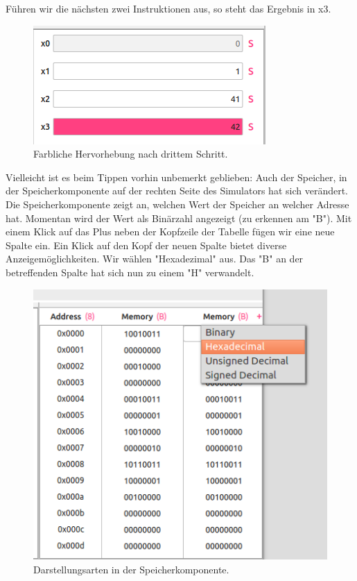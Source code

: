 Führen wir die nächsten zwei Instruktionen aus, so steht das Ergebnis in x3.
\begin{figure}[H]
	\centering
	\includegraphics[scale=1.0]{Images/first-steps-5.png}
	\caption{Farbliche Hervorhebung nach drittem Schritt.}
\end{figure}

Vielleicht ist es beim Tippen vorhin unbemerkt geblieben: Auch der Speicher, in
der Speicherkomponente auf der rechten Seite des Simulators hat sich verändert.
Die Speicherkomponente zeigt an, welchen Wert der Speicher an welcher Adresse
hat. Momentan wird der Wert als Binärzahl angezeigt (zu erkennen am "B"). Mit
einem Klick auf das Plus neben der Kopfzeile der Tabelle fügen wir eine neue
Spalte ein. Ein Klick auf den Kopf der neuen Spalte bietet diverse
Anzeigemöglichkeiten. Wir wählen "Hexadezimal" aus. Das "B" an der
betreffenden Spalte hat sich nun zu einem "H" verwandelt.
\begin{figure}[H]
	\centering
	\includegraphics[scale=1.0]{Images/first-steps-6.png}
	\caption{Darstellungsarten in der Speicherkomponente.}
\end{figure}

